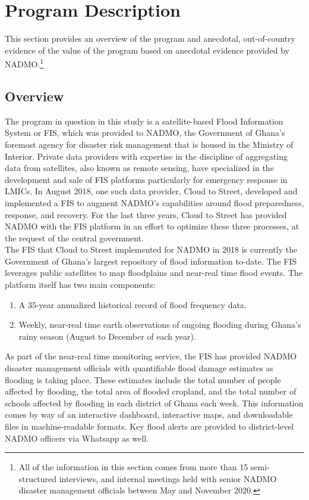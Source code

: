 \chapter{Program Description}

This section provides an overview of the program and anecdotal, out-of-country evidence of the value of the program based on anecdotal evidence provided by NADMO.\footnote{All of the information in this section comes from more than 15 semi-structured interviews, and internal meetings held with senior NADMO disaster management officials between May and November 2020.}

\section{Overview}

The program in question in this study is a satellite-based Flood Information System or FIS, which was provided to NADMO, the Government of Ghana’s foremost agency for disaster risk management that is housed in the Ministry of Interior. Private data providers with expertise in the discipline of aggregating data from satellites, also known as remote sensing, have specialized in the development and sale of FIS platforms particularly for emergency response in LMICs. In August 2018, one such data provider, Cloud to Street, developed and implemented a FIS to augment NADMO's capabilities around flood preparedness, response, and recovery. For the last three years, Cloud to Street has provided NADMO with the FIS platform in an effort to optimize these three processes, at the request of the central government.\\

The FIS that Cloud to Street implemented for NADMO in 2018 is currently the Government of Ghana’s largest repository of flood information to-date. The FIS leverages public satellites to map floodplains and near-real time flood events. The platform itself has two main components:
\begin{enumerate}
  \item A 35-year annualized historical record of flood frequency data.
  \item Weekly, near-real time earth observations of ongoing flooding during Ghana’s rainy season (August to December of each year).
\end{enumerate}

As part of the near-real time monitoring service, the FIS has provided NADMO disaster management officials with quantifiable flood damage estimates as flooding is taking place. These estimates include the total number of people affected by flooding, the total area of flooded cropland, and the total number of schools affected by flooding in each district of Ghana each week. This information comes by way of an interactive dashboard, interactive maps, and downloadable files in machine-readable formats. Key flood alerts are provided to district-level NADMO officers via Whatsapp as well.\\

